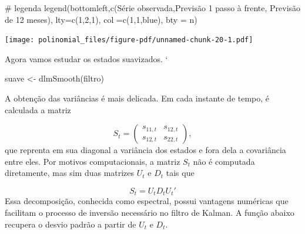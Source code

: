 \documentclass[
  letterpaper,
  DIV=11,
  numbers=noendperiod]{scrreprt}
\newenvironment{Shaded}{\begin{snugshade}}{\end{snugshade}}
\newcommand{\AttributeTok}[1]{\textcolor[rgb]{0.40,0.45,0.13}{#1}}
\newcommand{\CommentTok}[1]{\textcolor[rgb]{0.37,0.37,0.37}{#1}}
\newcommand{\DecValTok}[1]{\textcolor[rgb]{0.68,0.00,0.00}{#1}}
\newcommand{\FunctionTok}[1]{\textcolor[rgb]{0.28,0.35,0.67}{#1}}
\newcommand{\NormalTok}[1]{\textcolor[rgb]{0.00,0.23,0.31}{#1}}
\newcommand{\OtherTok}[1]{\textcolor[rgb]{0.00,0.23,0.31}{#1}}
\newcommand{\StringTok}[1]{\textcolor[rgb]{0.13,0.47,0.30}{#1}}
\begin{document}
\begin{Shaded}
\begin{Highlighting}[]
\CommentTok{\# legenda}
\FunctionTok{legend}\NormalTok{(}\StringTok{\textquotesingle{}bottomleft\textquotesingle{}}\NormalTok{,}\FunctionTok{c}\NormalTok{(}\StringTok{\textquotesingle{}Série observada\textquotesingle{}}\NormalTok{,}\StringTok{\textquotesingle{}Previsão 1 passo à frente\textquotesingle{}}\NormalTok{, }\StringTok{\textquotesingle{}Previsão de 12 meses\textquotesingle{}}\NormalTok{), }\AttributeTok{lty=}\FunctionTok{c}\NormalTok{(}\DecValTok{1}\NormalTok{,}\DecValTok{2}\NormalTok{,}\DecValTok{1}\NormalTok{), }\AttributeTok{col =}\FunctionTok{c}\NormalTok{(}\DecValTok{1}\NormalTok{,}\DecValTok{1}\NormalTok{,}\StringTok{\textquotesingle{}blue\textquotesingle{}}\NormalTok{), }\AttributeTok{bty =} \StringTok{\textquotesingle{}n\textquotesingle{}}\NormalTok{)}
\end{Highlighting}
\end{Shaded}

\texttt{[image: polinomial\_files/figure-pdf/unnamed-chunk-20-1.pdf]}

Agora vamos estudar os estados suavizados. `

\begin{Shaded}
\begin{Highlighting}[]
\NormalTok{suave }\OtherTok{\textless{}{-}} \FunctionTok{dlmSmooth}\NormalTok{(filtro)}
\end{Highlighting}
\end{Shaded}

A obtenção das variâncias é mais delicada. Em cada instante de tempo, é
calculada a matriz

\[S_t=\left( \begin{array}{cc} s_{11,t} & s_{12,t}\\s_{12,t}&s_{22,t}\end{array}\right),\]
que reprenta em sua diagonal a variância dos estados e fora dela a
covariância entre eles. Por motivos computacionais, a matriz \(S_t\) não
é computada diretamente, mas sim duas matrizes \(U_t\) e \(D_t\) tais
que

\[S_t=U_t D_t U_t'\] Essa decomposição, conhecida como espectral, possui
vantagens numéricas que facilitam o processo de inversão necessário no
filtro de Kalman. A função abaixo recupera o desvio padrão a partir de
\(U_t\) e \(D_t\).
\end{document}
